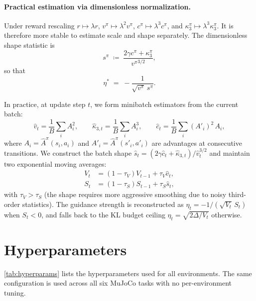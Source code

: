 \documentclass{article}
\theoremstyle{plain}
\theoremstyle{definition}
\theoremstyle{remark}
\begin{document}
\paragraph{Practical estimation via dimensionless normalization.}
Under reward rescaling $r \mapsto \lambda r$, $v^\pi \mapsto \lambda^2 v^\pi$, $c^\pi \mapsto \lambda^3 c^\pi$, and $\kappa_3^\pi \mapsto \lambda^3 \kappa_3^\pi$.
It is therefore more stable to estimate scale and shape separately. The dimensionless shape statistic is
\begin{equation}
  s^\pi
  \;\coloneqq\;
  \frac{2\gamma c^\pi + \kappa_3^\pi}{{v^\pi}^{3/2}},
\end{equation}
so that
\begin{equation}
  \eta^*
  \;=\;
  -\frac{1}{\sqrt{v^\pi}\,s^\pi}.
\end{equation}

In practice, at update step $t$, we form minibatch estimators from the current batch:
\begin{equation}
  \hat v_t = \frac{1}{B}\sum_i A_i^2,
  \qquad
  \hat \kappa_{3,t} = \frac{1}{B}\sum_i A_i^3,
  \qquad
  \hat c_t = \frac{1}{B}\sum_i (A'_i)^2 \, A_i,
\end{equation}
where $A_i = \hat{A}^\pi(s_i, a_i)$ and $A'_i = \hat{A}^\pi(s'_i, a'_i)$ are advantages at consecutive transitions.
We construct the batch shape $\hat s_t = (2\gamma \hat c_t + \hat \kappa_{3,t}) / \hat v_t^{3/2}$ and maintain two exponential moving averages:
\begin{align}
  V_t &= (1-\tau_V) V_{t-1} + \tau_V\hat v_t, \\
  S_t &= (1-\tau_S) S_{t-1} + \tau_S\hat s_t,
\end{align}
with $\tau_V > \tau_S$ (the shape requires more aggressive smoothing due to noisy third-order statistics).
The guidance strength is reconstructed as $\eta_t = -1/(\sqrt{V_t}\, S_t)$ when $S_t < 0$, and falls back to the KL budget ceiling $\eta_t = \sqrt{2\Delta / V_t}$ otherwise.

\section{Hyperparameters}
\label{app:hyperparams}

\cref{tab:hyperparams} lists the hyperparameters used for all environments.
The same configuration is used across all six MuJoCo tasks with no per-environment tuning.
\end{document}
